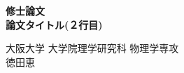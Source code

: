 \begin{center}
  \vspace{40mm}
  {\huge\noindent\textbf{修士論文}}\\
  \medskip
  {\huge\noindent\textbf{論文タイトル(２行目)}}\\
  \vspace{\baselineskip}

  {\Large\noindent
    大阪大学 大学院理学研究科 物理学専攻\\
    \vspace{\baselineskip}
    徳田恵\\
    \vspace{\baselineskip}
    \date{\Large \today}\\
  }
  \vspace{40mm}
\end{center}
